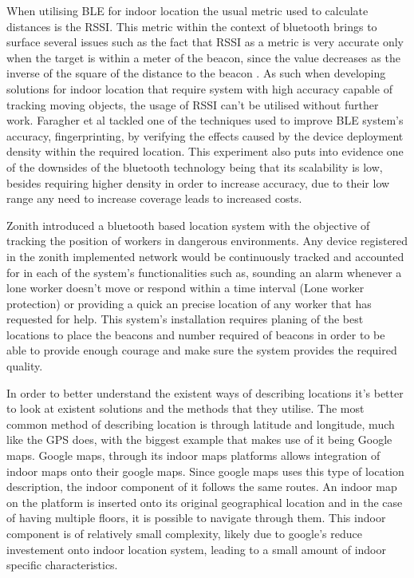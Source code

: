 When utilising BLE for indoor location the usual metric used to calculate distances is the RSSI. This metric within the context of bluetooth brings to surface several issues such as the fact that RSSI as a metric is very accurate only when the target is within a meter of the beacon, since the value decreases as the inverse of the square of the distance to the beacon . As such when developing solutions for indoor location that require system with high accuracy capable of tracking moving objects, the usage of RSSI can't be utilised without further work. Faragher et al \cite{bleacc} tackled one of the techniques used to improve BLE system's accuracy, fingerprinting, by verifying the effects caused by the device deployment density within the required location. This experiment also puts into evidence one of the downsides of the bluetooth technology being that its scalability is low, besides requiring higher density in order to increase accuracy, due to their low range any need to increase coverage leads to increased costs.


Zonith \cite{zonith} introduced a bluetooth based location system with the objective of tracking the position of workers in dangerous environments. Any device registered in the zonith implemented network would be continuously tracked and accounted for in each of the system's functionalities such as, sounding an alarm whenever a lone worker doesn't move or respond within a time interval (Lone worker protection) or providing a quick an precise location of any worker that has requested for help. This system's installation requires planing of the best locations to place the beacons and number required of beacons in order to be able to provide enough courage and make sure the system provides the required quality.


In order to better understand the existent ways of describing locations it's better to look at existent solutions and the methods that they utilise. The most common method of describing location is through latitude and longitude, much like the \ac{GPS} does, with the biggest example that makes use of it being Google maps. Google maps, through its indoor maps platforms \cite{googlemaps} allows integration of indoor maps onto their google maps. Since google maps uses this type of location description, the indoor component of it follows the same routes. An indoor map on the platform is inserted onto its original geographical location and in the case of having multiple floors, it is possible to navigate through them. This indoor component is of relatively small complexity, likely due to google's reduce investement onto indoor location system, leading to a small amount of indoor specific characteristics. 

